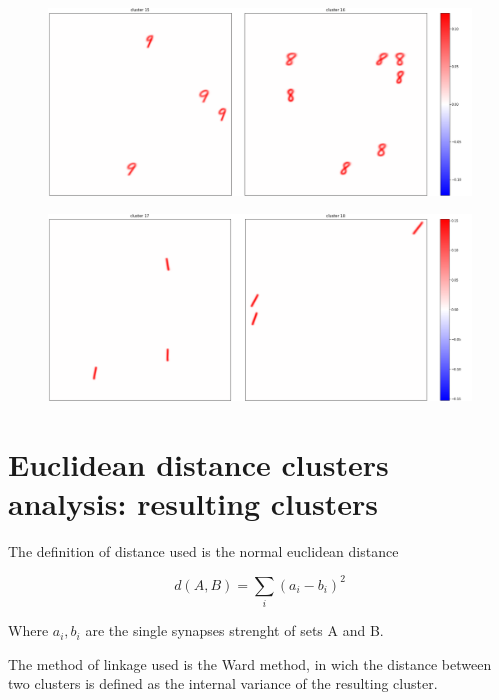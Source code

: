 \documentclass[a4paper]{report}
\begin{document}
\begin{figure} [H]
    \centering
    \includegraphics [width=\textwidth ] {c/h/15.png}
    \caption{}
\end{figure}

\begin{figure} [H]
    \centering
    \includegraphics [width=\textwidth ] {c/h/17.png}
    \caption{}
\end{figure}

\chapter{Euclidean distance clusters analysis: resulting clusters}

The definition of distance used is the normal euclidean distance

\begin{equation}
    d(A,B) = \sum_i (a_i - b_i)^2
\end{equation}

Where $a_i, b_i$ are the single synapses strenght of sets A and B.

The method of linkage used is the Ward method, in wich the distance between two clusters is defined as the internal variance of the resulting cluster.
\end{document}
